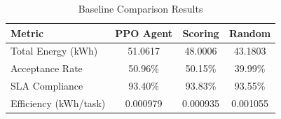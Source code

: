 
\begin{table}[h]
\centering
\caption{Baseline Comparison Results}
\label{tab:baseline}
\begin{tabular}{lccc}
\toprule
\textbf{Metric} & \textbf{PPO Agent} & \textbf{Scoring} & \textbf{Random} \\
\midrule
Total Energy (kWh) & 51.0617 & 48.0006 & 43.1803 \\
Acceptance Rate & 50.96\% & 50.15\% & 39.99\% \\
SLA Compliance & 93.40\% & 93.83\% & 93.55\% \\
Efficiency (kWh/task) & 0.000979 & 0.000935 & 0.001055 \\
\bottomrule
\end{tabular}
\end{table}
